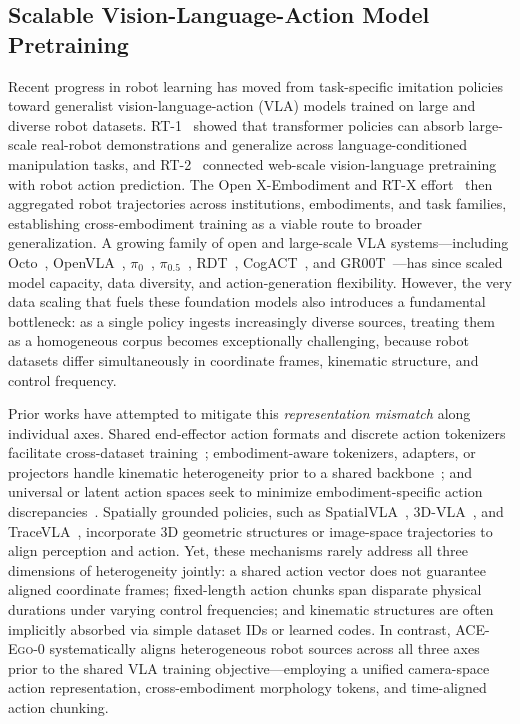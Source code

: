 \documentclass{article}
\newcommand{\OURS}{\textsc{ACE-Ego-0}\xspace}
\newcommand{\Ours}{\OURS}
\begin{document}
\subsection{Scalable Vision-Language-Action Model Pretraining}
Recent progress in robot learning has moved from task-specific imitation policies toward generalist vision-language-action (VLA) models trained on large and diverse robot datasets.
RT-1~\cite{brohan2023rt} showed that transformer policies can absorb large-scale real-robot demonstrations and generalize across language-conditioned manipulation tasks, and RT-2~\cite{zitkovich2023rt} connected web-scale vision-language pretraining with robot action prediction. 
The Open X-Embodiment and RT-X effort~\cite{o2024open} then aggregated robot trajectories across institutions, embodiments, and task families, establishing cross-embodiment training as a viable route to broader generalization.  
A growing family of open and large-scale VLA systems---including Octo~\cite{octo_2023}, OpenVLA~\cite{kim2025openvla}, $\pi_0$~\cite{BlackK-RSS-25}, $\pi_{0.5}$~\cite{pmlr-v305-black25a}, RDT~\cite{liu2025rdt}, CogACT~\cite{li2024cogact}, and GR00T~\cite{bjorck2025gr00t}---has since scaled model capacity, data diversity, and action-generation flexibility.
However, the very data scaling that fuels these foundation models also introduces a fundamental bottleneck: as a single policy ingests increasingly diverse sources, treating them as a homogeneous corpus becomes exceptionally challenging, because robot datasets differ simultaneously in coordinate frames, kinematic structure, and control frequency.

Prior works have attempted to mitigate this \emph{representation mismatch} along individual axes. Shared end-effector action formats and discrete action tokenizers facilitate cross-dataset training~\cite{o2024open,kim2025openvla}; embodiment-aware tokenizers, adapters, or projectors handle kinematic heterogeneity prior to a shared backbone~\cite{wang2024hpt,bjorck2025gr00t}; and universal or latent action spaces seek to minimize embodiment-specific action discrepancies~\cite{zheng2025uniact,ye2025lapa,liu2026rdt2}. Spatially grounded policies, such as SpatialVLA~\cite{qu2025spatialvla}, 3D-VLA~\cite{zhen2024threedvla}, and TraceVLA~\cite{zheng2024tracevla}, incorporate 3D geometric structures or image-space trajectories to align perception and action. 
Yet, these mechanisms rarely address all three dimensions of heterogeneity jointly: a shared action vector does not guarantee aligned coordinate frames; fixed-length action chunks span disparate physical durations under varying control frequencies; and kinematic structures are often implicitly absorbed via simple dataset IDs or learned codes. 
In contrast, \Ours systematically aligns heterogeneous robot sources across all three axes prior to the shared VLA training objective---employing a unified camera-space action representation, cross-embodiment morphology tokens, and time-aligned action chunking.
\end{document}
